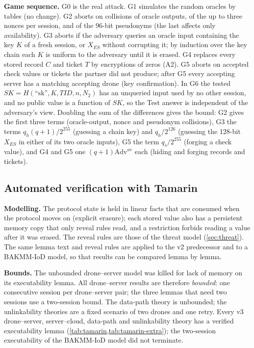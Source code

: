 \textbf{Game sequence.} G0 is the real attack. G1 simulates the random oracles by tables (no change). G2 aborts on collisions
of oracle outputs, of the up to three nonces per session, and of the 96-bit pseudonyms (the last affects only availability).
G3 aborts if the adversary queries an oracle input containing the key $K$ of a fresh session, or $X_{ES}$ without corrupting
it; by induction over the key chain each $K$ is uniform to the adversary until it is erased. G4 replaces every stored record
$C$ and ticket $T$ by encryptions of zeros (A2). G5 aborts on accepted check values or tickets the partner did not produce;
after G5 every accepting server has a matching accepting drone (key confirmation). In G6 the tested
$SK = H(\text{``sk''}, K, TID, n, N_2)$ has an unqueried input used by no other session, and no public value is a function of
$SK$, so the Test answer is independent of the adversary's view. Doubling the sum of the differences gives the bound: G2
gives the first three terms (oracle-output, nonce and pseudonym collisions), G3 the terms $q_h(q+1)/2^{255}$ (guessing a
chain key) and $q_h/2^{126}$ (guessing the 128-bit $X_{ES}$ in either of its two oracle inputs), G5 the term $q_s/2^{255}$
(forging a check value), and G4 and G5 one $(q+1)\mathrm{Adv}^{ae}$ each (hiding and forging records and tickets).

\subsection{Automated verification with Tamarin}\label{sec:tamarin}
\textbf{Modelling.} The protocol state is held in linear facts that are consumed when the protocol moves on (explicit
erasure); each stored value also has a persistent memory copy that only reveal rules read, and a restriction forbids reading a
value after it was erased. The reveal rules are those of the threat model (\cref{sec:threat}). The same lemma text and reveal
rules are applied to the v2 predecessor and to a BAKMM-IoD model, so that results can be compared lemma by lemma.

\textbf{Bounds.} The unbounded drone--server model was killed for lack of memory on its executability lemma. All drone--server
results are therefore \emph{bounded}: one consecutive session per drone--server pair; the three lemmas that need two sessions
use a two-session bound. The data-path theory is unbounded; the unlinkability theories are a fixed scenario of two drones and
one retry. Every v3 drone--server, server--cloud, data-path and unlinkability theory has a verified executability lemma
(\cref{tab:tamarin,tab:tamarin-extra}); the two-session executability of the BAKMM-IoD model did not terminate.

